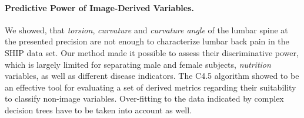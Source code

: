 \documentclass[a4paper,twoside]{style/article}
\begin{document}
\paragraph{Predictive Power of Image-Derived Variables.}
We showed, that \emph{torsion}, \emph{curvature} and \emph{curvature angle} of the lumbar spine at the presented precision are not enough to characterize lumbar back pain in the SHIP data set.
Our method made it possible to assess their discriminative power, which is largely limited for separating male and female subjects, \emph{nutrition} variables, as well as different disease indicators.
The C4.5 algorithm showed to be an effective tool for evaluating a set of derived metrics regarding their suitability to classify non-image variables.
Over-fitting to the data indicated by complex decision trees have to be taken into account as well.
%
\end{document}

